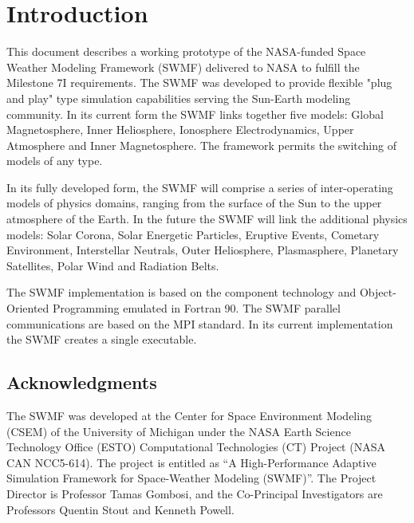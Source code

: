 


\chapter{Introduction}


This document describes a working prototype of the NASA-funded Space
Weather Modeling Framework (SWMF) delivered to NASA to fulfill the
Milestone 7I requirements. The SWMF was developed to provide flexible
"plug and play" type simulation capabilities serving the Sun-Earth
modeling community.  In its current form the SWMF links together five
models: Global Magnetosphere, Inner Heliosphere, Ionosphere
Electrodynamics, Upper Atmosphere and Inner Magnetosphere. The
framework permits the switching of models of any type.


In its fully developed form, the SWMF will comprise a series of
inter-operating models of physics domains, ranging from the surface of
the Sun to the upper atmosphere of the Earth.  In the future the SWMF
will link the additional physics models: Solar Corona, Solar Energetic
Particles, Eruptive Events, Cometary Environment, Interstellar
Neutrals, Outer Heliosphere, Plasmasphere, Planetary Satellites, Polar
Wind and Radiation Belts.


The SWMF implementation is based on the component technology and
Object-Oriented Programming emulated in Fortran 90.  The SWMF parallel
communications are based on the MPI standard.  In its current
implementation the SWMF creates a single executable.


\section{Acknowledgments}

The SWMF was developed at the Center for Space Environment Modeling
(CSEM) of the University of Michigan under the NASA Earth Science
Technology Office (ESTO) Computational Technologies (CT) Project (NASA
CAN NCC5-614). The project is entitled as ``A High-Performance
Adaptive Simulation Framework for Space-Weather Modeling (SWMF)''.
The Project Director is Professor Tamas Gombosi, and the Co-Principal
Investigators are Professors Quentin Stout and Kenneth Powell.

